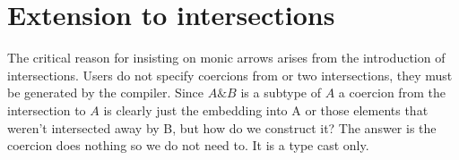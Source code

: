 \documentclass[oneside]{book}
\begin{document}
\section{Extension to intersections}
The critical reason for insisting on monic arrows arises from the introduction
of intersections. Users do not specify coercions from or two intersections,
they must be generated by the compiler. Since $A \& B$ is a subtype of $A$
a coercion from the intersection to $A$ is clearly just the embedding 
into A or those elements that weren't intersected away by B, but
how do we construct it? The answer is the coercion does nothing so we
do not need to. It is a type cast only.
\end{document}
